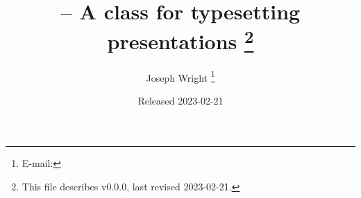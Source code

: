 \documentclass{l3doc}
\def\filedate{2023-02-21}
\def\fileversion{v0.0.0}
\begin{document}
\title{%
   -- A class for typesetting presentations%
  \thanks{This file describes \fileversion,
    last revised \filedate.}%
}

\author{%
  Joseph Wright%
  \thanks{%
    E-mail: %
  }%
}

\date{Released \filedate}

\maketitle

\tableofcontents

\begin{documentation}

\end{documentation}

\PrintIndex
\end{document}
